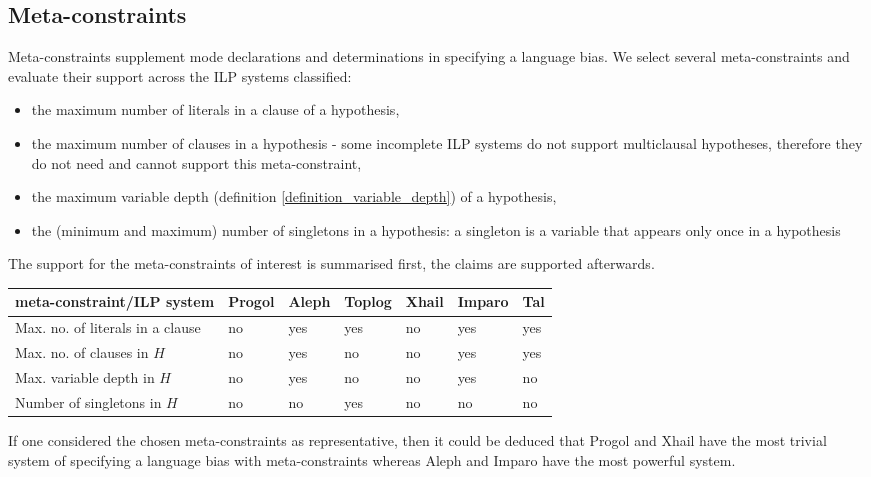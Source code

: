 \subsection{Meta-constraints}\label{classification_meta-constraints}
Meta-constraints supplement mode declarations and determinations in specifying a language bias. We select several meta-constraints and evaluate their support  across the ILP systems classified:

\begin{itemize}
\item the maximum number of literals in a clause of a hypothesis,
\item the maximum number of clauses in a hypothesis - some incomplete ILP systems do not support multiclausal hypotheses, therefore they do not need and cannot support this meta-constraint,
\item the maximum variable depth (definition \ref{definition_variable_depth}) of a hypothesis,
\item the (minimum and maximum) number of singletons in a hypothesis:
a singleton is a variable that appears only once in a hypothesis\cite{santos2008toplogWebsite}
\end{itemize}

The support for the meta-constraints of interest is summarised first, the claims are supported afterwards.

\begin{center}
 \label{tab:classification_by_meta-constraints} 
 \begin{tabular}{| l | l | l | l | l | l | l |}
    \hline
    meta-constraint/ILP system & Progol & Aleph & Toplog & Xhail & Imparo & Tal \\ \hline
    Max. no. of literals in a clause & no & yes & yes & no & yes & yes\\ \hline
    Max. no. of clauses in $H$ & no & yes & no & no & yes & yes\\ \hline
    Max. variable depth in $H$ & no & yes & no & no & yes & no\\ \hline
    Number of singletons in $H$ & no & no & yes & no & no & no\\ \hline
  \end{tabular}
  \end{center}
  
If one considered the chosen meta-constraints as representative, then it could be deduced that Progol and Xhail have the most trivial system of specifying a language bias with meta-constraints whereas Aleph and Imparo have the most powerful system.

